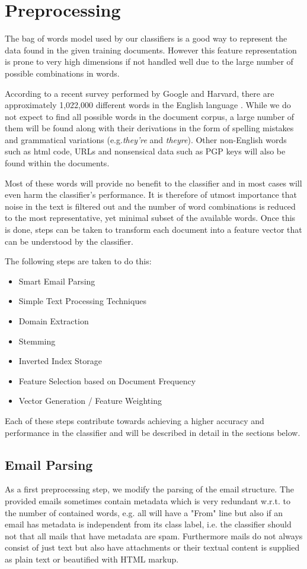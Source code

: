 \section{Preprocessing}
The bag of words model used by our classifiers is a good way to represent the data found in the given training documents. However this feature representation is prone to very high dimensions if not handled well due to the large number of possible combinations in words. 

According to a recent survey performed by Google and Harvard, there are approximately 1,022,000 different words in the English language \cite{google2010words}. While we do not expect to find all possible words in the document corpus, a large number of them will be found along with their derivations in the form of spelling mistakes and grammatical variations (e.g.{\it they're} and {\it theyre}). Other non-English words such as html code, URLs and nonsensical data such as PGP keys will also be found within the documents.

Most of these words will provide no benefit to the classifier and in most cases will even harm the classifier's performance. It is therefore of utmost importance that noise in the text is filtered out and the number of word combinations is reduced to the most representative, yet minimal subset of the available words. Once this is done, steps can be taken to transform each document into a feature vector that can be understood by the classifier. 

The following steps are taken to do this:
\begin{itemize}
	\item Smart Email Parsing
	\item Simple Text Processing Techniques
	\item Domain Extraction
	\item Stemming
	\item Inverted Index Storage
	\item Feature Selection based on Document Frequency
	\item Vector Generation / Feature Weighting
\end{itemize}

Each of these steps contribute towards achieving a higher accuracy and performance in the classifier and will be described in detail in the sections below.

\subsection{Email Parsing}
As a first preprocessing step, we modify the parsing of the email structure.
The provided emails sometimes contain metadata which is very redundant w.r.t. to the number of contained words, e.g. all will have a "From" line but also if an email has metadata is independent from its class label, i.e. the classifier should not that all mails that have metadata are spam.
Furthermore mails do not always consist of just text but also have attachments or their textual content is supplied as plain text or beautified with HTML markup.

